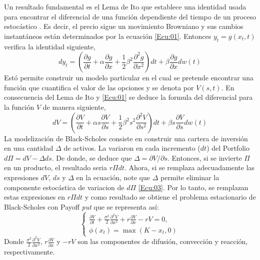\documentclass[12pt]{article}
\begin{document}
Un resultado fundamental es el Lema de Ito que establece una identidad usada para encontrar el diferencial de una función dependiente del tiempo de un proceso estocástico \cite{Lib07}. Es decir, el precio sigue un movimiento Browniano y sus cambios instantáneos están determinados por la ecuación \eqref{Ecu:01}. Entonces $y_t = g(x_t,t)$ verifica la identidad siguiente,
\begin{equation*} 
dy_t = (\dfrac{\partial{g}}{\partial{t}} + \alpha \dfrac{\partial{g}}{\partial{x}} + \frac{1}{2}\beta^2\dfrac{\partial^2{g}}{\partial{x^2}})dt + \beta \dfrac{\partial{g}}{\partial{x}} dw(t) 
\label{Ecu:02}
\end{equation*}
Estó permite construir un modelo particular en el cual se pretende encontrar una función que cuantifica el valor de las opciones y se denota por $V(s,t)$. En consecuencia del Lema de Ito y \eqref{Ecu:01} se deduce la formula del diferencial para la función  $V$ de manera siguiente, 
\begin{equation*} 
dV = (\dfrac{\partial{V}}{\partial{t}} + \alpha s \dfrac{\partial{V}}{\partial{s}} + \frac{1}{2}\beta^2s^2\dfrac{\partial^2{V}}{\partial{s^2}})dt + \beta s \dfrac{\partial{V}}{\partial{s}} dw(t) 
\label{Ecu:03}
\end{equation*}
La modelización de Black-Scholes consiste en construir una cartera de inversión en una cantidad $\Delta$ de activos. La variaron en cada incremento ($dt$) del Portfolio $d\varPi = dV-\Delta ds$. De donde, se deduce que $\Delta =\partial{V}/\partial{s}$. Entonces, si se invierte $\varPi $ en un producto, el resultado seria $\textit{r}\varPi dt$. Ahora, si se remplaza adecuadamente las expresiones $dV$, $ds$ y $\Delta$ en la ecuación, note que $\Delta$ permite eliminar la componente estocástica de variacion de $d\varPi$  \ref{Ecu:03}. Por lo tanto, se remplazan estas expresiones en $\textit{r}\varPi dt$ y como resultado se obtiene el problema estacionario de Black-Scholes con Payoff \textit{put} que se representa así:
\begin{equation} 
\left\{
\begin{array}{c}
\frac{\partial{V}}{\partial{t}} + \frac{{\sigma}^2}{2}\frac{\partial^2{V}}{\partial{x^2}}
+ r\frac{\partial{V}}{\partial{x}}-rV=0,\\
\phi(x_t) = \max{(K-x_t,0)} 
\end{array} \right.
\label{Ecu:04}
\end{equation}
Donde $ \frac{{\sigma}^2}{2}\frac{\partial^2{V}}{\partial{x^2}}$, $r\frac{\partial V}{\partial x}$ y $-rV$ son las componentes de difusión, convección y reacción, respectivamente.
\end{document}
